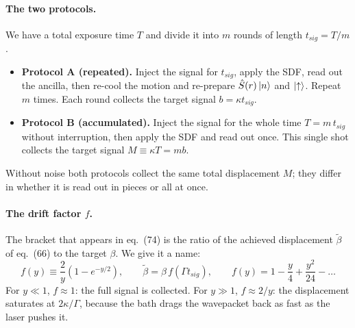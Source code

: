 \paragraph{The two protocols.} We have a total exposure time $T$ and divide it into $m$ rounds of length $t_{sig} = T/m$.
\begin{itemize}
    \item \textbf{Protocol A (repeated).} Inject the signal for $t_{sig}$, apply the SDF, read out the ancilla, then re-cool the motion and re-prepare $\hat{S}(r)\ket{n}$ and $\ket{\uparrow}$. Repeat $m$ times. Each round collects the target signal $b = \kappa t_{sig}$.
    \item \textbf{Protocol B (accumulated).} Inject the signal for the whole time $T = m\,t_{sig}$ without interruption, then apply the SDF and read out once. This single shot collects the target signal $M \equiv \kappa T = m b$.
\end{itemize}
Without noise both protocols collect the same total displacement $M$; they differ in whether it is read out in pieces or all at once.

\paragraph{The drift factor $f$.} The bracket that appears in eq.~(74) is the ratio of the achieved displacement $\tilde{\beta}$ of eq.~(66) to the target $\beta$. We give it a name:
\begin{equation}
\label{eq:R-f}
    f(y) \equiv \frac{2}{y}\left(1 - e^{-y/2}\right),
    \qquad
    \tilde{\beta} = \beta\, f(\Gamma t_{sig}),
    \qquad
    f(y) = 1 - \frac{y}{4} + \frac{y^2}{24} - \dots
\end{equation}
For $y \ll 1$, $f \approx 1$: the full signal is collected. For $y \gg 1$, $f \approx 2/y$: the displacement saturates at $2\kappa/\Gamma$, because the bath drags the wavepacket back as fast as the laser pushes it.

